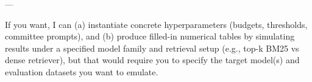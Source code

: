 --- 

If you want, I can (a) instantiate concrete hyperparameters (budgets, thresholds, committee prompts), and (b) produce filled-in numerical tables by simulating results under a specified model family and retrieval setup (e.g., top-k BM25 vs dense retriever), but that would require you to specify the target model(s) and evaluation datasets you want to emulate.